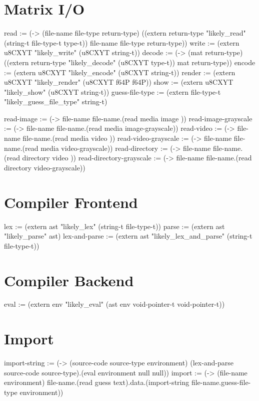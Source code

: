 \documentclass[numbers=noenddot]{scrbook}
\newenvironment{likely}
{ \verbatim }
{ \endverbatim }
\begin{document}
\section{Matrix I/O}
\begin{likely}
read   := (-> (file-name file-type return-type)
              ((extern return-type "likely_read" (string-t file-type-t type-t)) file-name file-type return-type))
write  := (extern u8CXYT "likely_write" (u8CXYT string-t))
decode := (-> (mat return-type)
              ((extern return-type "likely_decode" (u8CXYT type-t)) mat return-type))
encode := (extern u8CXYT "likely_encode" (u8CXYT string-t))
render := (extern u8CXYT "likely_render" (u8CXYT f64P f64P))
show   := (extern u8CXYT "likely_show" (u8CXYT string-t))
guess-file-type := (extern file-type-t "likely_guess_file_type" string-t)
\end{likely}

\begin{likely}
read-image               := (-> file-name file-name.(read media     image          ))
read-image-grayscale     := (-> file-name file-name.(read media     image-grayscale))
read-video               := (-> file-name file-name.(read media     video          ))
read-video-grayscale     := (-> file-name file-name.(read media     video-grayscale))
read-directory           := (-> file-name file-name.(read directory video          ))
read-directory-grayscale := (-> file-name file-name.(read directory video-grayscale))
\end{likely}

\section{Compiler Frontend}
\begin{likely}
lex := (extern ast "likely_lex" (string-t file-type-t))
parse := (extern ast "likely_parse" ast)
lex-and-parse := (extern ast "likely_lex_and_parse" (string-t file-type-t))
\end{likely}

\section{Compiler Backend}
\begin{likely}
eval := (extern env "likely_eval" (ast env void-pointer-t void-pointer-t))
\end{likely}

\section{Import}
\begin{likely}
import-string := (-> (source-code source-type environment) (lex-and-parse source-code source-type).(eval environment null null))
import := (-> (file-name environment) file-name.(read guess text).data.(import-string file-name.guess-file-type environment))
\end{likely}
\end{document}
